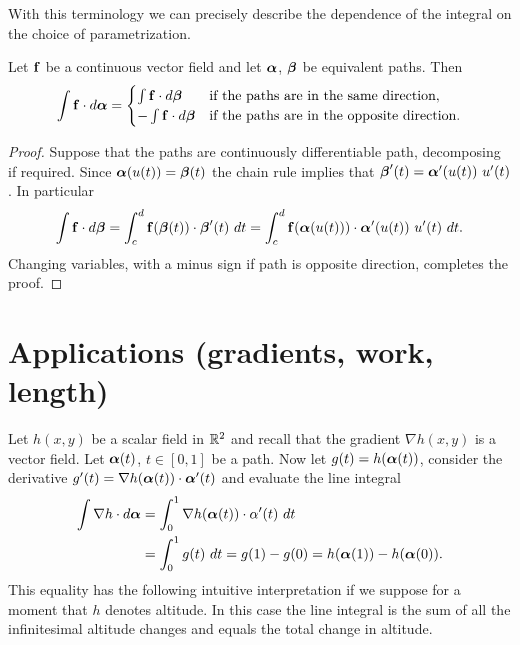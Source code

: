 With this terminology we can precisely describe the dependence of the integral on the choice of parametrization.

\begin{theorem}%
    \label{thm:change-param}
    Let \(\mathbf{f}\) be a continuous vector field and let \(\boldsymbol{\alpha}\), \(\boldsymbol{\beta}\) be equivalent paths.
    Then
    \[
        \int \mathbf{f} \cdot d\boldsymbol{\alpha} =
        \begin{cases}
            \int \mathbf{f} \cdot d\boldsymbol{\beta}   & \text{if the paths are in the same direction},     \\
            - \int \mathbf{f} \cdot d\boldsymbol{\beta} & \text{if the paths are in the opposite direction}.
        \end{cases}
    \]
\end{theorem}

\begin{proof}
    Suppose that the paths are continuously differentiable path, decomposing if required.
    Since \(\boldsymbol{\alpha}(u(t)) = \boldsymbol{\beta}(t)\) the chain rule implies that
    \( \bbeta'(t) = \aalpha'(u(t)) \ u'(t)\).
    In particular
    \[
        \displaystyle \int \mathbf{f} \cdot  d\boldsymbol{\beta} = \displaystyle \int_c^d \mathbf{f}(\boldsymbol{\beta}(t)) \cdot \boldsymbol{\beta}'(t) \ dt =  \displaystyle \int_c^d \mathbf{f}(\boldsymbol{\alpha}(u(t))) \cdot \boldsymbol{\alpha}'(u(t)) \ u'(t) \ dt.
    \]
    Changing variables, with a minus sign if path is opposite direction, completes the proof.
\end{proof}


\section{Applications (gradients, work, length)}

Let \(h(x,y)\) be a scalar field in \(\mathbb{R}^2\)
and recall that the gradient \(\nabla h(x,y)\) is a vector field.
Let \(\boldsymbol{\alpha}(t)\), \(t\in [0,1]\) be a path.
Now let \(g(t) = h(\boldsymbol{\alpha}(t))\), consider the derivative
\(g'(t) = \nabla h(\boldsymbol{\alpha}(t))\cdot \boldsymbol{\alpha}'(t)\)
and evaluate the line integral
\[
    \begin{aligned}
        \int \nabla h \cdot d\boldsymbol{\alpha}
         & = \int_0^1 \nabla h(\boldsymbol{\alpha}(t)) \cdot \alpha'(t)\ dt \\
         & = \int_0^1 g(t) \ dt
        = g(1) - g(0)
        = h(\boldsymbol{\alpha}(1)) - h(\boldsymbol{\alpha}(0)).
    \end{aligned}
\]
This equality has the following intuitive interpretation if we suppose for a moment that \(h\) denotes altitude.
In this case the line integral is the sum of all the infinitesimal altitude changes and equals the total change in altitude.

